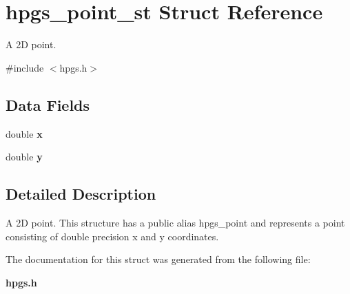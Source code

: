 \section{hpgs\_\-point\_\-st Struct Reference}
\label{structhpgs__point__st}


A 2D point.  




{\ttfamily \#include $<$hpgs.h$>$}

\subsection*{Data Fields}
\begin{DoxyCompactItemize}
\item 
double {\bfseries x}\label{structhpgs__point__st_a511eb8c19d4db5d0de9056d168cda20f}

\item 
double {\bfseries y}\label{structhpgs__point__st_a635076d8d6573e32f3ae6d2222807ed0}

\end{DoxyCompactItemize}


\subsection{Detailed Description}
A 2D point. This structure has a public alias {\ttfamily hpgs\_\-point} and represents a point consisting of double precision x and y coordinates. 

The documentation for this struct was generated from the following file:\begin{DoxyCompactItemize}
\item 
{\bf hpgs.h}\end{DoxyCompactItemize}
